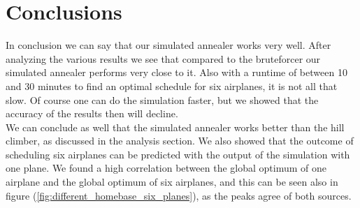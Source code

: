 \documentclass[journal]{IEEEtran}
\begin{document}
\section{Conclusions}
In conclusion we can say that our simulated annealer works very well. After analyzing the various results we see that compared to the bruteforcer our simulated annealer performs very close to it. Also with a runtime of between 10 and 30 minutes to find an optimal schedule for six airplanes, it is not all that slow. Of course one can do the simulation faster, but we showed that the accuracy of the results then will decline.\\
We can conclude as well that the simulated annealer works better than the hill climber, as discussed in the analysis section. We also showed that the outcome of scheduling six airplanes can be predicted with the output of the simulation with one plane. We found a high correlation between the global optimum of one airplane and the global optimum of six airplanes, and this can be seen also in figure (\ref{fig:different_homebase_six_planes}), as the peaks agree of both sources.


\end{document}
